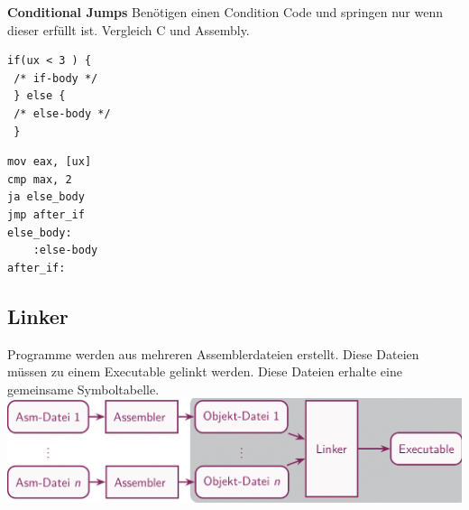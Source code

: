 \documentclass[7pt,landscape,a4paper]{scrartcl}
\begin{document}
\begin{multicols*}{4}
\textbf{Conditional Jumps}
Benötigen einen Condition Code und springen nur wenn dieser erfüllt ist. Vergleich C und Assembly.\\
\begin{minipage}[b]{0,5\linewidth}
\begin{verbatim}
if(ux < 3 ) {
 /* if-body */
 } else {
 /* else-body */ 
 }
\end{verbatim}
\end{minipage}
\begin{minipage}[b]{0,5\linewidth}
\begin{verbatim}
mov eax, [ux]
cmp max, 2
ja else_body
jmp after_if
else_body:
	:else-body
after_if:
\end{verbatim}
\end{minipage}

\subsection{Linker} 
\vspace{-0.75em}
Programme werden aus mehreren Assemblerdateien erstellt. Diese Dateien müssen zu einem Executable gelinkt werden. Diese Dateien erhalte eine gemeinsame Symboltabelle.\\
\includegraphics[width=\linewidth]{linker}


\end{multicols*}
\end{document}
